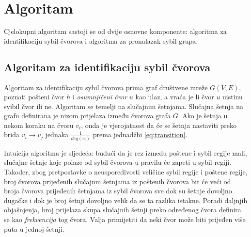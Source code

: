 \documentclass[times, utf8, seminar, numeric]{fer}
\begin{document}
\section{Algoritam} \label{sec:algorithm}
Cjelokupni algoritam sastoji se od dvije osnovne komponente: algoritma za identifikaciju sybil čvorova i algoritma za pronalazak sybil grupa.

\subsection{Algoritam za identifikaciju sybil čvorova}
Algoritam za identifikaciju sybil čvorova prima graf društvene mreže $G(V, E)$, poznati pošteni čvor $h$ i \textit{osumnjičeni čvor}  $u$ kao ulaz, a vraća je li čvor $u$ uistinu syibil čvor ili ne. Algoritam se temelji na slučajnim šetnjama. Slučajna šetnja na grafu definirana je nizom prijelaza između čvorova grafa $G$. Ako je šetnja u nekom koraku na čvoru $v_i$, onda je vjerojatnost da će se šetnja nastaviti preko brida $v_i \to v_j$ jednaka $\frac{1}{deg(v_i)}$ prema jednadžbi \ref{eq:transition}.

Intuicija algoritma je sljedeća: budući da je rez između poštene i sybil regije mali, slučajne šetnje koje polaze od sybil čvorova u pravilu će zapeti u sybil regiji. Također, zbog pretpostavke o neusporedivosti veličine sybil regije i poštene regije, broj čvorova prijeđenih slučajnm šetnjama iz poštenih čvorova bit će veći od broja čvorova prijeđenih šetnjama iz sybil čvorova sve dok su šetnje dovoljno dugačke i dok je broj šetnji dovoljno velik da se ta razlika istakne. Poradi daljnjih objašnjenja, broj prijelaza skupa slučajnih šetnji preko određenog čvora definira se kao \textit{frekvencija} tog čvora. Valja primijetiti da neki čvor može biti prijeđen više puta u jednoj šetnji.
\end{document}
